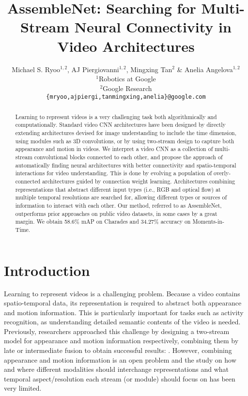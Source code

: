 \documentclass{article} \usepackage{iclr2020_conference,times}
\title{AssembleNet: Searching for Multi-Stream Neural Connectivity in Video Architectures}
\author{Michael S. Ryoo$^{1,2}$, AJ Piergiovanni$^{1,2}$, Mingxing Tan$^2$ \& Anelia Angelova$^{1,2}$\\
$^1$Robotics at Google\\
$^2$Google Research\\
\texttt{\{mryoo,ajpiergi,tanmingxing,anelia\}@google.com}
}
\begin{document}
\maketitle


\begin{abstract}
Learning to represent videos is a very challenging task both algorithmically and computationally. Standard video CNN architectures have been designed by directly extending architectures devised for image understanding to include the time dimension, using modules such as 3D convolutions, or by using two-stream design to capture both appearance and motion in videos. We interpret a video CNN as a collection of multi-stream convolutional blocks connected to each other, and propose the approach of automatically finding neural architectures with better connectivity and spatio-temporal interactions for video understanding.
This is done by evolving a population of overly-connected architectures guided by connection weight learning. 
Architectures combining representations that abstract different input types (i.e., RGB and optical flow) at multiple temporal resolutions are searched for, allowing different types or sources of information to interact with each other. Our method, referred to as AssembleNet, outperforms prior approaches on public video datasets, in some cases by a great margin. We obtain 58.6\% mAP on Charades and 34.27\% accuracy on Moments-in-Time.
\end{abstract}


\section{Introduction}


Learning to represent videos is a challenging problem. Because a video contains spatio-temporal data, its representation is required to abstract both appearance and motion information. This is particularly important for tasks such as activity recognition, as understanding detailed semantic contents of the video is needed. Previously, researchers approached this challenge by designing a two-stream model for appearance and motion information respectively, combining them by late or intermediate fusion to obtain successful results: \cite{simonyan2014two,feichtenhofer2016convolutional,feichtenhofer2016tsres,feichtenhofer2017tsmult,feichtenhofer2018slowfast}. However, combining appearance and motion information is an open problem and 
the study on how and where different modalities should interchange representations and what temporal aspect/resolution each stream (or module) should focus on has been very limited.
\end{document}

